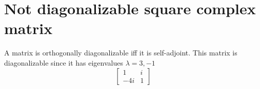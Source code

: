 \section{Not diagonalizable square complex matrix}
A matrix is orthogonally diagonalizable iff it is self-adjoint.
This matrix is diagonalizable since it has eigenvalues $\lambda = 3, -1$
\[
\begin{bmatrix}
    1 & i \\
    -4i & 1
\end{bmatrix}
\]
